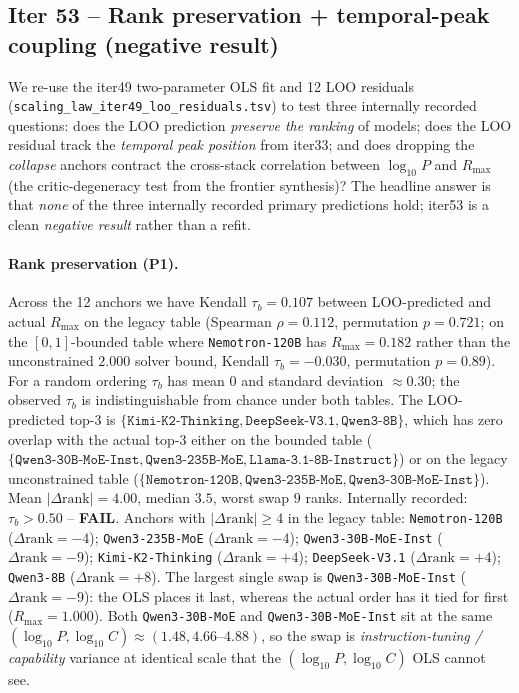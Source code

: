 \subsection{Iter 53 -- Rank preservation + temporal-peak coupling (negative result)}
\label{sec:scaling-law-iter53}
\label{sec:iter53}

We re-use the iter49 two-parameter OLS fit and 12 LOO residuals
(\texttt{scaling\_law\_iter49\_loo\_residuals.tsv}) to test three internally recorded
questions: does the LOO prediction \emph{preserve the ranking} of models;
does the LOO residual track the \emph{temporal peak position} from iter33;
and does dropping the \emph{collapse} anchors contract the cross-stack
correlation between $\log_{10} P$ and $R_{\max}$ (the critic-degeneracy test
from the frontier synthesis)? The headline answer is that \emph{none} of the
three internally recorded primary predictions hold; iter53 is a clean
\emph{negative result} rather than a refit.

\paragraph{Rank preservation (P1).}
Across the 12 anchors we have Kendall $\tau_b=0.107$ between LOO-predicted and
actual $R_{\max}$ on the legacy table (Spearman $\rho=0.112$, permutation $p=0.721$; on the $[0,1]$-bounded table where \texttt{Nemotron-120B} has $R_{\max}=0.182$ rather than the unconstrained $2.000$ solver bound, Kendall $\tau_b=-0.030$, permutation $p=0.89$). For a random
ordering $\tau_b$ has mean $0$ and standard deviation $\approx 0.30$; the
observed $\tau_b$ is indistinguishable from chance under both tables. The LOO-predicted top-3 is
$\{\texttt{Kimi-K2-Thinking}, \texttt{DeepSeek-V3.1}, \texttt{Qwen3-8B}\}$, which has zero overlap with the actual top-3 either on the bounded table ($\{\texttt{Qwen3-30B-MoE-Inst}, \texttt{Qwen3-235B-MoE}, \texttt{Llama-3.1-8B-Instruct}\}$) or on the legacy unconstrained table ($\{\texttt{Nemotron-120B}, \texttt{Qwen3-235B-MoE}, \texttt{Qwen3-30B-MoE-Inst}\}$). Mean
$\lvert\Delta\text{rank}\rvert=4.00$, median $3.5$, worst swap $9$
ranks. Internally recorded: $\tau_b > 0.50$ -- \textbf{FAIL}. Anchors with
$\lvert\Delta\text{rank}\rvert \geq 4$ in the legacy table: \texttt{Nemotron-120B} ($\Delta\text{rank}=-4$); \texttt{Qwen3-235B-MoE} ($\Delta\text{rank}=-4$); \texttt{Qwen3-30B-MoE-Inst} ($\Delta\text{rank}=-9$); \texttt{Kimi-K2-Thinking} ($\Delta\text{rank}=+4$); \texttt{DeepSeek-V3.1} ($\Delta\text{rank}=+4$); \texttt{Qwen3-8B} ($\Delta\text{rank}=+8$). The largest single swap is
\texttt{Qwen3-30B-MoE-Inst} ($\Delta\text{rank}=-9$): the OLS places it last, whereas the
actual order has it tied for first ($R_{\max}=1.000$). Both \texttt{Qwen3-30B-MoE} and \texttt{Qwen3-30B-MoE-Inst} sit at the same
$(\log_{10} P, \log_{10} C)\approx(1.48, 4.66\text{--}4.88)$, so the swap is
\emph{instruction-tuning / capability} variance at identical scale that the $(\log_{10} P, \log_{10} C)$ OLS cannot see.

